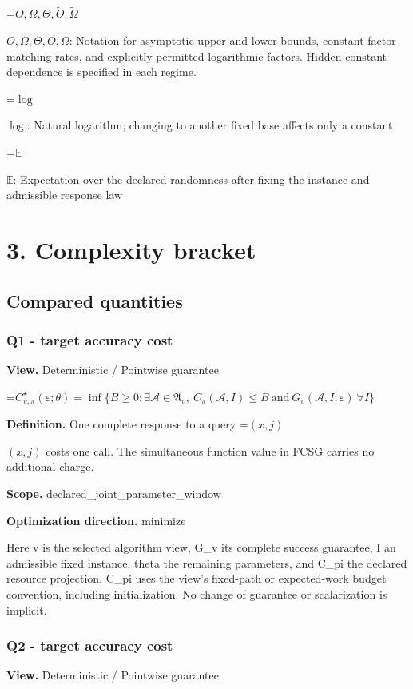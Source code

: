 \documentclass[10pt,a4paper]{article}
\newcommand{\AtlasMath}[1]{\par\begingroup\centering\setbox0=\hbox{$\displaystyle #1$}\ifdim\wd0>1.4\linewidth\typeout{ATLAS WIDE FORMULA: \the\wd0}\fi\ifdim\wd0>\linewidth\resizebox{\linewidth}{!}{\box0}\else\box0\fi\par\endgroup}
\newcommand{\AtlasInlineMath}[1]{\begingroup\setbox0=\hbox{$#1$}\ifdim\wd0>.4\linewidth\endgroup\AtlasMath{#1}\else\endgroup$#1$\fi}
\begin{document}
\AtlasInlineMath{O,\Omega,\Theta,\widetilde{O},\widetilde\Omega}: Notation for asymptotic upper and lower bounds, constant-factor matching rates, and explicitly permitted logarithmic factors. Hidden-constant dependence is specified in each regime.

\AtlasInlineMath{\log}: Natural logarithm; changing to another fixed base affects only a constant

\AtlasInlineMath{\mathbb{E}}: Expectation over the declared randomness after fixing the instance and admissible response law

\section{3. Complexity bracket}
\subsection{Compared quantities}
\subsubsection{Q1 - target accuracy cost}
\textbf{View.} Deterministic / Pointwise guarantee

\AtlasMath{C^\star_{v,\pi}(\varepsilon;\theta)=\inf\{B\ge0:\exists\mathcal A\in\mathfrak A_v,\ C_\pi(\mathcal A,I)\le B\ \text{and}\ G_v(\mathcal A,I;\varepsilon)\ \forall I\}}
\textbf{Definition.} One complete response to a query \AtlasInlineMath{(x,j)} costs one call. The simultaneous function value in FCSG carries no additional charge.

\textbf{Scope.} declared\_joint\_parameter\_window

\textbf{Optimization direction.} minimize

Here v is the selected algorithm view, G\_v its complete success guarantee, I an admissible fixed instance, theta the remaining parameters, and C\_pi the declared resource projection. C\_pi uses the view's fixed-path or expected-work budget convention, including initialization. No change of guarantee or scalarization is implicit.

\subsubsection{Q2 - target accuracy cost}
\textbf{View.} Deterministic / Pointwise guarantee
\end{document}
